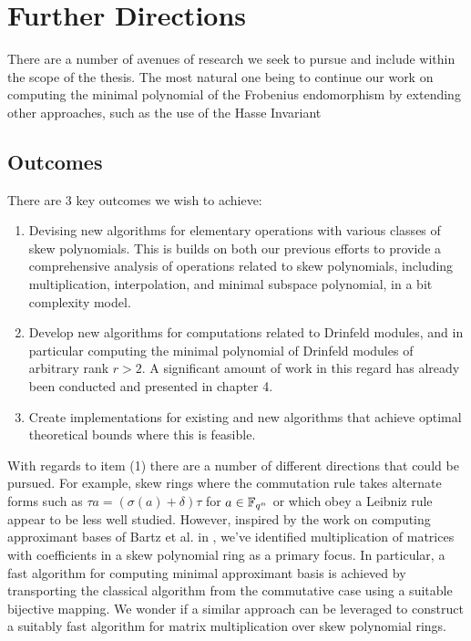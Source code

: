 
\chapter{Further Directions} \label{ch-1}

There are a number of avenues of research we seek to pursue and include within the scope of the thesis. The most natural one being to continue our work on computing the minimal polynomial of the Frobenius endomorphism by extending other approaches, such as the use of the Hasse Invariant 


\section{Outcomes}

There are 3 key outcomes we wish to achieve:

\begin{enumerate}
    \item Devising new algorithms for elementary operations with various classes of skew polynomials. This is builds on both our previous efforts to provide a comprehensive analysis of operations related to skew polynomials, including multiplication, interpolation, and minimal subspace polynomial, in a bit complexity model.
    \item Develop new algorithms for computations related to Drinfeld modules, and in particular computing the minimal polynomial of Drinfeld modules of arbitrary rank $r > 2$. A significant amount of work in this regard has already been conducted and presented in chapter 4.
    \item Create implementations for existing and new algorithms that achieve optimal theoretical bounds where this is feasible. 
\end{enumerate}

With regards to item (1) there are a number of different directions that could be pursued. For example, skew rings where the commutation rule takes alternate forms such as $\tau a = (\sigma(a) + \delta)\tau$ for $a \in \mathbb{F}_{q^n}$ or which obey a Leibniz rule appear to be less well studied. However, inspired by the work on computing approximant bases of Bartz et al. in \cite{rosen2021}, we've identified multiplication of matrices with coefficients in a skew polynomial ring as a primary focus. In particular, a fast algorithm for computing minimal approximant basis is achieved by transporting the classical algorithm from the commutative case using a suitable bijective mapping. We wonder if a similar approach can be leveraged to construct a suitably fast algorithm for matrix multiplication over skew polynomial rings. 

